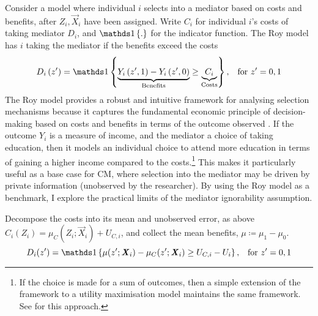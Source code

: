 Consider a model where individual $i$ selects into a mediator based on costs and benefits, after $Z_i, \vec X_i$ have been assigned.
Write $C_i$ for individual $i$'s costs of taking mediator $D_i$, and $\indicator{.}$ for the indicator function.
The Roy model has $i$ taking the mediator if the benefits exceed the costs
\begin{equation}
    \label{eqn:roy-model}
    D_i \left( z' \right) = \indicator{
    \underbrace{Y_i\left( z', 1 \right) - Y_i\left( z', 0 \right)}_{\text{Benefits}}
    \geq \underbrace{C_i}_{\text{Costs}}}, \;\;\; \text{for } z'=0,1
\end{equation}
The Roy model provides a robust and intuitive framework for analysing selection mechanisms because it captures the fundamental economic principle of decision-making based on costs and benefits in terms of the outcome observed \citep{roy1951some,heckman1990empirical}.
If the outcome $Y_i$ is a measure of income, and the mediator a choice of taking education, then it models an individual choice to attend more education in terms of gaining a higher income compared to the costs.\footnote{
    If the choice is made for a sum of outcomes, then a simple extension of the framework to a utility maximisation model maintains the same framework.
    See \cite{heckman1990empirical} for this approach.
}
This makes it particularly useful as a base case for CM, where selection into the mediator may be driven by private information (unobserved by the researcher).
By using the Roy model as a benchmark, I explore the practical limits of the mediator ignorability assumption.

Decompose the costs into its mean and unobserved error, as above $C_i(Z_i) = \mu_{C}(Z_i; \vec X_i) + U_{C,i}$, and collect the mean benefits, $\mu \coloneqq \mu_1 - \mu_0$.
\[ D_i(z') = \indicator{
    \mu(z'; \vec X_i) - \mu_C(z'; \vec X_i) \geq U_{C,i} - U_i }
        , \;\;\; \text{for } z'=0,1 \]

